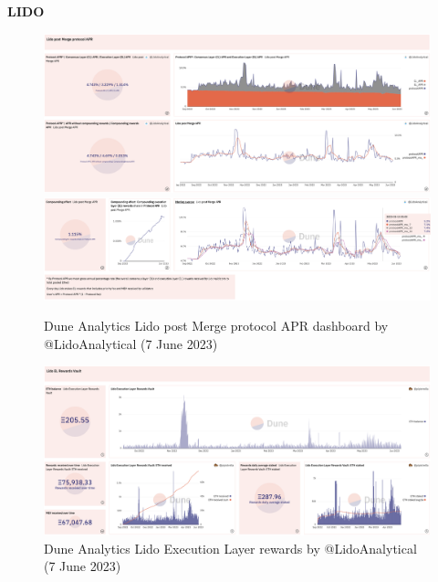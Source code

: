 \documentclass[UTF8]{article}
\begin{document}
{\clearpage
\textbf{LIDO}
\begin{figure}[htbp]
\begin{center}
\includegraphics[width=\linewidth]{images/dunelido1}\\
\includegraphics[width=\linewidth]{images/dunelido2}
\caption{Dune Analytics Lido post Merge protocol APR dashboard by @LidoAnalytical  (7 June 2023)}
\label{fig:dunelido1}
\end{center}
\end{figure}

\begin{figure}[htbp]
\begin{center}
\includegraphics[width=\linewidth]{images/dunelido3}
\caption{Dune Analytics Lido Execution Layer rewards by @LidoAnalytical  (7 June 2023)}
\label{fig:dunelido3}
\end{center}
\end{figure}

}
\end{document}
